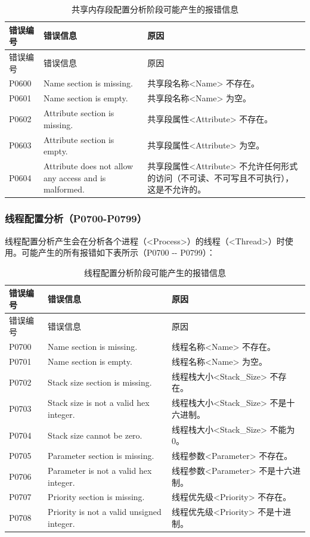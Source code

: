\begin{xltabular}{\textwidth}{@{}>{\hsize\raggedright\arraybackslash}X>{\hsize\raggedright\arraybackslash}X>{\hsize\raggedright\arraybackslash}X@{}}
\caption{共享内存段配置分析阶段可能产生的报错信息}\label{tab:5-9}\\
\toprule
错误编号 & 错误信息 & 原因\tabularnewline
\endfirsthead
\toprule
错误编号 & 错误信息 & 原因\tabularnewline
\midrule
\endhead
\bottomrule
\endlastfoot
P0600 & Name section is missing. &
共享段名称<Name> 不存在。\tabularnewline
P0601 & Name section is empty. &
共享段名称<Name> 为空。\tabularnewline
P0602 & Attribute section is missing. &
共享段属性<Attribute> 不存在。\tabularnewline
P0603 & Attribute section is empty. &
共享段属性<Attribute> 为空。\tabularnewline
P0604 & Attribute does not allow any access and is malformed. &
共享段属性<Attribute> 不允许任何形式的访问（不可读、不可写且不可执行），这是不允许的。\tabularnewline
\end{xltabular}

\subsubsection{线程配置分析（P0700-P0799）}\label{subsubsec:5-6-2-8}

线程配置分析产生会在分析各个进程（<Process>）的线程（<Thread>）时使用。可能产生的所有报错如下表所示（P0700
-\/- P0799）：

\begin{xltabular}{\textwidth}{@{}>{\hsize\raggedright\arraybackslash}X>{\hsize\raggedright\arraybackslash}X>{\hsize\raggedright\arraybackslash}X@{}}
\caption{线程配置分析阶段可能产生的报错信息}\label{tab:5-10}\\
\toprule
错误编号 & 错误信息 & 原因\tabularnewline
\endfirsthead
\toprule
错误编号 & 错误信息 & 原因\tabularnewline
\midrule
\endhead
\bottomrule
\endlastfoot
P0700 & Name section is missing. &
线程名称<Name> 不存在。\tabularnewline
P0701 & Name section is empty. &
线程名称<Name> 为空。\tabularnewline
P0702 & Stack size section is missing. &
线程栈大小<Stack\_\allowbreak{}Size> 不存在。\tabularnewline
P0703 & Stack size is not a valid hex integer. &
线程栈大小<Stack\_\allowbreak{}Size> 不是十六进制。\tabularnewline
P0704 & Stack size cannot be zero. &
线程栈大小<Stack\_\allowbreak{}Size> 不能为0。\tabularnewline
P0705 & Parameter section is missing. &
线程参数<Parameter> 不存在。\tabularnewline
P0706 & Parameter is not a valid hex integer. &
线程参数<Parameter> 不是十六进制。\tabularnewline
P0707 & Priority section is missing. &
线程优先级<Priority> 不存在。\tabularnewline
P0708 & Priority is not a valid unsigned integer. &
线程优先级<Priority> 不是十进制。\tabularnewline
\end{xltabular}

